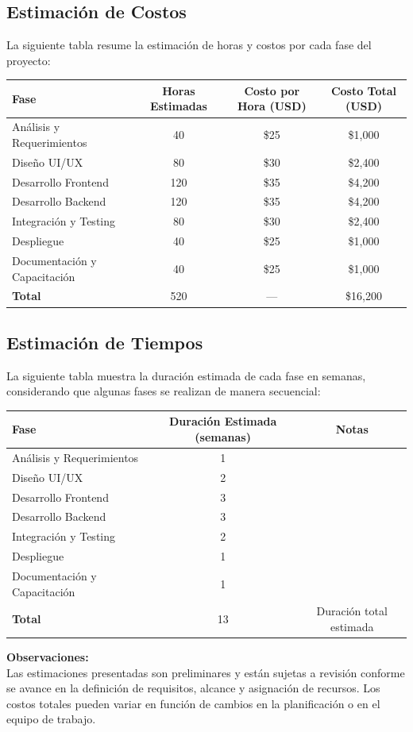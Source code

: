 \documentclass[11pt]{article}
\begin{document}
\subsection{Estimación de Costos}

La siguiente tabla resume la estimación de horas y costos por cada fase del proyecto:

\begin{center}
\begin{tabular}{lccc}
\toprule
\textbf{Fase} & \textbf{Horas Estimadas} & \textbf{Costo por Hora (USD)} & \textbf{Costo Total (USD)} \\
\midrule
Análisis y Requerimientos       & 40  & \$25 & \$1,000 \\
Diseño UI/UX                   & 80  & \$30 & \$2,400 \\
Desarrollo Frontend            & 120 & \$35 & \$4,200 \\
Desarrollo Backend             & 120 & \$35 & \$4,200 \\
Integración y Testing          & 80  & \$30 & \$2,400 \\
Despliegue                     & 40  & \$25 & \$1,000 \\
Documentación y Capacitación   & 40  & \$25 & \$1,000 \\
\midrule
\textbf{Total}                 & 520 & ---  & \$16,200 \\
\bottomrule
\end{tabular}
\end{center}

\subsection{Estimación de Tiempos}

La siguiente tabla muestra la duración estimada de cada fase en semanas, considerando que algunas fases se realizan de manera secuencial:

\begin{center}
\begin{tabular}{lcc}
\toprule
\textbf{Fase} & \textbf{Duración Estimada (semanas)} & \textbf{Notas} \\
\midrule
Análisis y Requerimientos       & 1 & \\
Diseño UI/UX                   & 2 & \\
Desarrollo Frontend            & 3 & \\
Desarrollo Backend             & 3 & \\
Integración y Testing          & 2 & \\
Despliegue                     & 1 & \\
Documentación y Capacitación   & 1 & \\
\midrule
\textbf{Total}                 & 13 & Duración total estimada \\
\bottomrule
\end{tabular}
\end{center}

\bigskip
\textbf{Observaciones:} \\
Las estimaciones presentadas son preliminares y están sujetas a revisión conforme se avance en la definición de requisitos, alcance y asignación de recursos. Los costos totales pueden variar en función de cambios en la planificación o en el equipo de trabajo.
\end{document}
